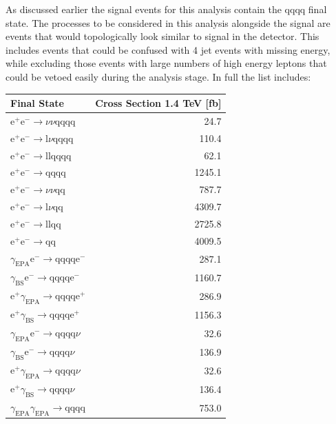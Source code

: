 As discussed earlier the signal events for this analysis contain the \nu{\nu}qqqq final state. The processes to be considered in this analysis alongside the signal are events that would topologically look similar to signal in the detector. This includes events that could be confused with 4 jet events with missing energy, while excluding those events with large numbers of high energy leptons that could be vetoed easily during the analysis stage. In full the list includes:

\begin{table}[h!]
\centering
\begin{tabular}{ l r }
\hline
Final State & Cross Section 1.4 TeV [fb] \\ 
\hline
$\text{e}^{+}\text{e}^{-} \rightarrow \nu{\nu}\text{qqqq}$ & 24.7 \\
$\text{e}^{+}\text{e}^{-} \rightarrow \text{l}\nu\text{qqqq}$ & 110.4\\
$\text{e}^{+}\text{e}^{-} \rightarrow \text{llqqqq}$ & 62.1\\
$\text{e}^{+}\text{e}^{-} \rightarrow \text{qqqq}$ & 1245.1\\
$\text{e}^{+}\text{e}^{-} \rightarrow \nu{\nu}\text{qq}$ & 787.7\\
$\text{e}^{+}\text{e}^{-} \rightarrow \text{l}\nu\text{qq}$ & 4309.7\\
$\text{e}^{+}\text{e}^{-} \rightarrow \text{llqq}$ & 2725.8\\
$\text{e}^{+}\text{e}^{-} \rightarrow \text{qq}$ & 4009.5\\
$\gamma_{\text{EPA}}\text{e}^{-} \rightarrow \text{qqqq}\text{e}^{-}$ & 287.1\\
$\gamma_{\text{BS}}\text{e}^{-} \rightarrow \text{qqqq}\text{e}^{-}$ & 1160.7\\
$\text{e}^{+}\gamma_{\text{EPA}} \rightarrow \text{qqqq}\text{e}^{+}$ & 286.9\\
$\text{e}^{+}\gamma_{\text{BS}} \rightarrow \text{qqqq}\text{e}^{+}$ & 1156.3\\
$\gamma_{\text{EPA}}\text{e}^{-} \rightarrow \text{qqqq}\nu$ & 32.6\\
$\gamma_{\text{BS}}\text{e}^{-} \rightarrow \text{qqqq}\nu$ & 136.9\\
$\text{e}^{+}\gamma_{\text{EPA}} \rightarrow \text{qqqq}\nu$ & 32.6\\
$\text{e}^{+}\gamma_{\text{BS}} \rightarrow \text{qqqq}\nu$ & 136.4\\
$\gamma_{\text{EPA}}\gamma_{\text{EPA}} \rightarrow \text{qqqq}$ & 753.0\\

\end{tabular}
\end{table}
